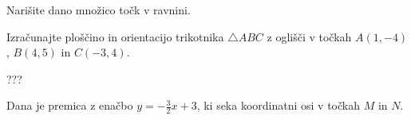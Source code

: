 \documentclass[addpoints]{exam}
\begin{document}
\begin{questions}


    \question
    Narišite dano množico točk v ravnini.
    \begin{parts}
        \part[4]
        $[-2,3)\times [1,\infty)$

            \begin{solution}[7cm]
                ????
            \end{solution}

        \part[4]
        $\left\{(x,y)\in\mathbb{R}^2 \mid (y>-2)\land (y=-x)\right\} $

            \begin{solution}[5.5cm]
                ????
            \end{solution}

    \end{parts}
    
    
    \newpage

    \question[4]
    Izračunajte ploščino in orientacijo trikotnika $\triangle ABC$ z oglišči v točkah $A(1,-4)$, $B(4,5)$ in $C(-3,4)$.
    
    
    \begin{solution}[5cm]
        ???
    \end{solution}

        


    \question
    Dana je premica z enačbo $y=-\frac{3}{2}x+3$, ki seka koordinatni osi v točkah $M$ in $N$.

\end{questions}
\end{document}
